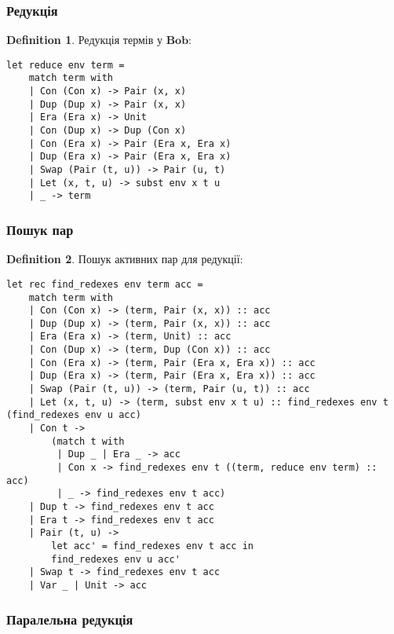 \documentclass{article}
\theoremstyle{definition}
\newtheorem{definition}{Definition}
\begin{document}
\subsubsection{Редукція}

\begin{definition}
Редукція термів у $\mathbf{Bob}$:
\begin{lstlisting}[mathescape=true]
let reduce env term =
    match term with
    | Con (Con x) -> Pair (x, x)
    | Dup (Dup x) -> Pair (x, x)
    | Era (Era x) -> Unit
    | Con (Dup x) -> Dup (Con x)
    | Con (Era x) -> Pair (Era x, Era x)
    | Dup (Era x) -> Pair (Era x, Era x)
    | Swap (Pair (t, u)) -> Pair (u, t)
    | Let (x, t, u) -> subst env x t u
    | _ -> term
\end{lstlisting}
\end{definition}

\subsubsection{Пошук пар}

\begin{definition}
Пошук активних пар для редукції:
\begin{lstlisting}[mathescape=true]
let rec find_redexes env term acc =
    match term with
    | Con (Con x) -> (term, Pair (x, x)) :: acc
    | Dup (Dup x) -> (term, Pair (x, x)) :: acc
    | Era (Era x) -> (term, Unit) :: acc
    | Con (Dup x) -> (term, Dup (Con x)) :: acc
    | Con (Era x) -> (term, Pair (Era x, Era x)) :: acc
    | Dup (Era x) -> (term, Pair (Era x, Era x)) :: acc
    | Swap (Pair (t, u)) -> (term, Pair (u, t)) :: acc
    | Let (x, t, u) -> (term, subst env x t u) :: find_redexes env t (find_redexes env u acc)
    | Con t ->
        (match t with
         | Dup _ | Era _ -> acc
         | Con x -> find_redexes env t ((term, reduce env term) :: acc)
         | _ -> find_redexes env t acc)
    | Dup t -> find_redexes env t acc
    | Era t -> find_redexes env t acc
    | Pair (t, u) ->
        let acc' = find_redexes env t acc in
        find_redexes env u acc'
    | Swap t -> find_redexes env t acc
    | Var _ | Unit -> acc
\end{lstlisting}
\end{definition}

\subsubsection{Паралельна редукція}
\end{document}
